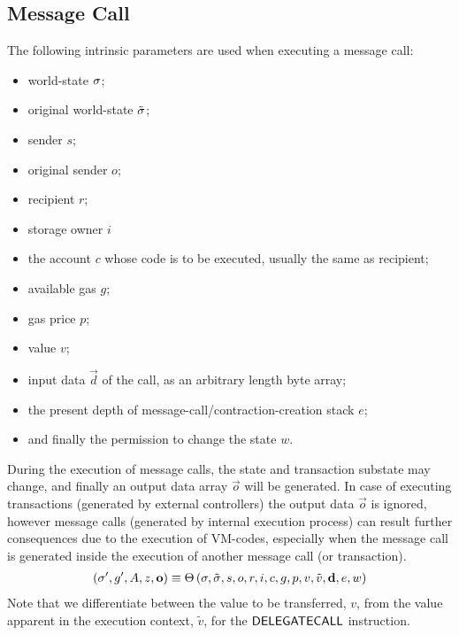 \subsection{Message Call}\label{sec:execution}
The following intrinsic parameters are used when executing a message call:
\begin{itemize}[nosep]
	\item world-state ${\mathbf{\sigma}}$;

	\item original world-state $\tilde{\mathbf{\sigma}}$;

	\item sender $s$;

	\item original sender $o$;

	\item recipient $r$;
	
	\item storage owner $i$

	\item the account $c$ whose code is to be executed, usually the same as recipient; 

	\item available gas $g$;



	\item gas price $p$;

	\item value $v$;

	\item input data $\vec{d}$ of the call, as an arbitrary length byte array;

	\item the present depth of message-call/contraction-creation stack $e$;

	\item and finally the permission to change the state $w$.
\end{itemize}

During the execution of message calls, 
the state and transaction substate may change,
and finally an output data array $\vec{o}$ will be generated.
In case of executing transactions (generated by external controllers) the output data $\vec{o}$ is ignored, however message calls (generated by internal execution process) can result further consequences due to the execution of VM-codes, especially when the message call is generated inside the execution of another message call (or transaction).
\begin{align}
  	\left(\mathbf{\sigma}', g', A, z, \mathbf{o} \right) \equiv \mathrm{\Theta}\left(\mathbf{\sigma}, \tilde{\mathbf{\sigma}},s,o,r,i,c,g, p,v,\tilde{v},\mathbf{d},e,w \right)
\end{align}  
Note that we differentiate between the value to be transferred, $v$, from the value apparent in the execution context, $\tilde{v}$, for the $\mathsf{DELEGATECALL}$ instruction.

